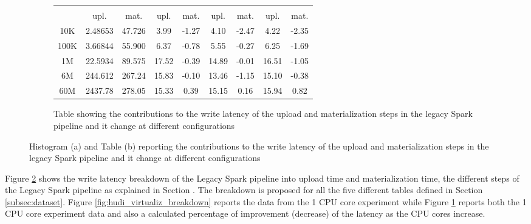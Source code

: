 \begin{figure}
    \begin{subfigure}[b]{\textwidth}
        \begin{tabular}{c c c c c c c c c} 
            \toprule
             &  &  &  & \\
            & upl. & mat. & upl. & mat. & upl. & mat. & upl. & mat.\\
            \midrule
            10K &  2.48653 & 47.726 & 3.99 & -1.27 & 4.10 & -2.47 & 4.22 & -2.35\\
            100K & 3.66844 & 55.900 & 6.37 & -0.78 & 5.55 & -0.27 & 6.25 & -1.69\\
            1M   & 22.5934 & 89.575 & 17.52 & -0.39 & 14.89 & -0.01 & 16.51 & -1.05\\
            6M   & 244.612 & 267.24 & 15.83 & -0.10 & 13.46 & -1.15 & 15.10 & -0.38\\
            60M &  2437.78 & 278.05 & 15.33 & 0.39 & 15.15 & 0.16 & 15.94 & 0.82\\
            \bottomrule
        \end{tabular}
        \caption{Table showing the contributions to the write latency of the upload and materialization steps in the legacy Spark pipeline and it change at different  configurations}
        \label{tbl:hudi_virtualiz_breakdown_cpu_perc}
    \end{subfigure}
    \caption{Histogram (a) and Table (b) reporting the contributions to the write latency of the upload and materialization steps in the legacy Spark pipeline and it change at different  configurations}
    \label{fig_tbl:hudi_virtualiz_breakdown}
\end{figure}

Figure \ref{fig_tbl:hudi_virtualiz_breakdown} shows the write latency breakdown of the Legacy Spark pipeline into upload time and materialization time, the different steps of the Legacy Spark pipeline as explained in Section . The breakdown is proposed for all the five different tables defined in Section \ref{subsec:dataset}. Figure \ref{fig:hudi_virtualiz_breakdown} reports the data from the 1 \gls{CPU} core experiment while Figure \ref{tbl:hudi_virtualiz_breakdown_cpu_perc} reports both the 1 \gls{CPU} core experiment data and also a calculated percentage of improvement (decrease) of the latency as the \gls{CPU} cores increase.

